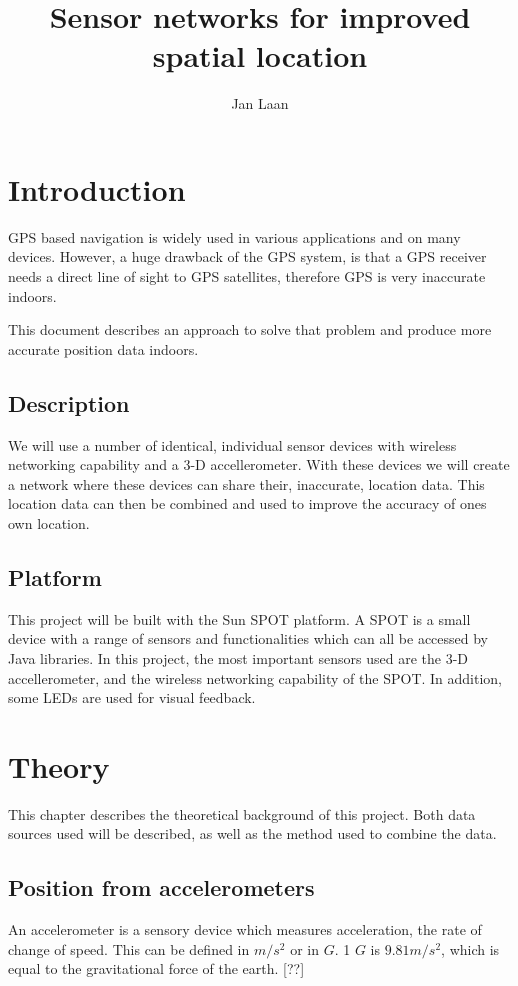 \documentclass[twoside, 11pt]{uva-bachelor-thesis}
\author{Jan Laan}
\title{Sensor networks for improved spatial location}
\begin{document}
\maketitle

\tableofcontents

\chapter{Introduction}
GPS based navigation is widely used in various applications and on many devices. However, a huge drawback of the GPS system, is that a GPS receiver needs a direct line of sight to GPS satellites, therefore GPS is very inaccurate indoors. 

This document describes an approach to solve that problem and produce more accurate position data indoors.


\section{Description}
We will use a number of identical, individual sensor devices with wireless networking capability and a 3-D accellerometer. With these devices we will create a network where these devices can share their, inaccurate, location data. This location data can then be combined  and used to improve the accuracy of ones own location.

\section{Platform}
This project will be built with the Sun SPOT platform. A SPOT is a small device with a range of sensors and functionalities which can all be accessed by Java libraries. In this project, the most important sensors used are the 3-D accellerometer, and the wireless networking capability of the SPOT. In addition, some LEDs are used for visual feedback.

\chapter{Theory}
This chapter describes the theoretical background of this project. Both data sources used will be described, as well as the method used to combine the data.
\section{Position from accelerometers}
An accelerometer is a sensory device which measures acceleration, the rate of change of speed. This can be defined in $m/s^2$ or in $G$. 1 $G$ is $9.81 m/s^2$, which is equal to the gravitational force of the earth. [??]
\end{document}
